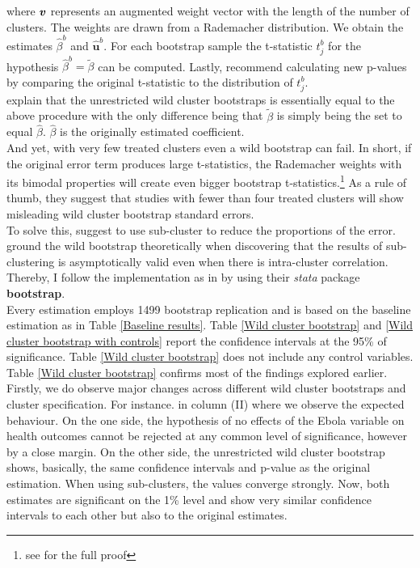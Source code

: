 \documentclass{article}
\begin{document}
where $\textbf{\textit{v}}$ represents an augmented weight vector with the length of the number of clusters. The weights are drawn from a Rademacher distribution. We obtain the estimates $\hat{\beta}^{b}$ and $\hat{\textbf{u}}^{b}$. For each bootstrap sample the t-statistic $t_j^{b} $ for the hypothesis $\hat{\beta}^{b} = \tilde{\beta}$ can be computed. Lastly, \cite{cameron2008bootstrap} recommend calculating new p-values by comparing the original t-statistic to the distribution of $t_j^{b} $. \\
\cite{mackinnon2017wild} explain that the unrestricted wild cluster bootstraps is essentially equal to the above procedure with the only difference being that $\tilde{\beta}$ is simply being the set to equal $\hat{\beta}$. $\hat{\beta}$ is the originally estimated coefficient.\\
And yet, with very few treated clusters even a wild bootstrap can fail. In short, if the original error term produces large t-statistics, the Rademacher weights with its bimodal properties will create even bigger bootstrap t-statistics.\footnote{see \cite{mackinnon2017wild} for the full proof} As a rule of thumb, they suggest that studies with fewer than four treated clusters will show misleading wild cluster bootstrap standard errors. \\
To solve this, \cite{mackinnon2018wild} suggest to use sub-cluster to reduce the proportions of the error. \cite{djogbenou2018asymptotic} ground the wild bootstrap theoretically when discovering that the results of sub-clustering is asymptotically valid even when there is intra-cluster correlation. Thereby, I follow the implementation as in \cite{roodman2019fast} by using their \textit{stata} package \textbf{bootstrap}.\\
Every estimation employs 1499 bootstrap replication and is based on the baseline estimation as in Table \ref{Baseline results}. Table \ref{Wild cluster bootstrap} and \ref{Wild cluster bootstrap with controls} report the confidence intervals at the 95\% of significance. Table \ref{Wild cluster bootstrap} does not include any control variables. \\
Table \ref{Wild cluster bootstrap} confirms most of the findings explored earlier. Firstly, we do observe major changes across different wild cluster bootstraps and cluster specification. For instance. in column (II) where we observe the expected behaviour. On the one side, the hypothesis of no effects of the Ebola variable on health outcomes cannot be rejected at any common level of significance, however by a close margin. On the other side, the unrestricted wild cluster bootstrap shows, basically, the same confidence intervals and p-value as the original estimation. When using sub-clusters, the values converge strongly. Now, both estimates are significant on the 1\% level and show very similar confidence intervals to each other but also to the original estimates. \\
\end{document}
